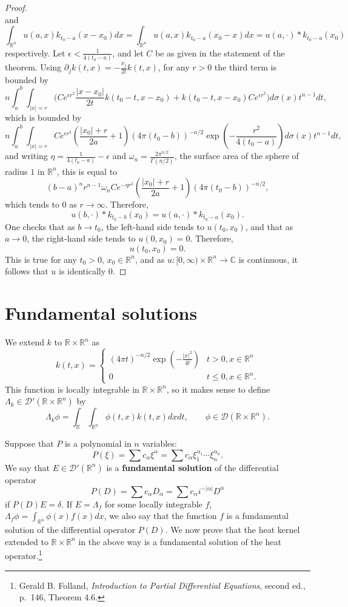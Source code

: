 \documentclass{article}
\begin{document}
\begin{proof}
\[\]
and
\[
\int_{\mathbb{R}^n} u(a,x) k_{t_0-a}(x-x_0) dx = \int_{\mathbb{R}^n} u(a,x) k_{t_0-a}(x_0-x) dx
=u(a,\cdot)*k_{t_0-a}(x_0)
\]
respectively. Let $\epsilon<\frac{1}{4(t_0-a)}$, and let $C$ be as given in the statement of the theorem. 
Using $\partial_j k (t,x) = -\frac{x_j}{2t}k(t,x)$, for any $r>0$ the third term is bounded by
\[
n \int_a^b \int_{|x|=r} \Big( Ce^{\epsilon r^2} \frac{|x-x_0|}{2t} k(t_0-t,x-x_0)+k(t_0-t,x-x_0) Ce^{\epsilon r^2}\Big) d\sigma(x) t^{n-1} dt,
\]
which is bounded by
\[
n\int_a^b \int_{|x|=r} Ce^{\epsilon r^2} \left( \frac{|x_0|+r}{2a}+1 \right) (4\pi(t_0-b))^{-n/2} 
\exp\left(-\frac{r^2}{4(t_0-a)} \right) d\sigma(x) t^{n-1} dt,
\]
and writing $\eta= \frac{1}{4(t_0-a)}-\epsilon$ and 
$\omega_n=\frac{2\pi^{n/2}}{\Gamma(n/2)}$, the surface area of the sphere of radius $1$ in $\mathbb{R}^n$,
this is equal to
\[
(b-a)^n r^{n-1} \omega_n Ce^{-\eta r^2}  \left( \frac{|x_0|+r}{2a}+1 \right) (4\pi(t_0-b))^{-n/2},
\]
which tends to $0$ as $r \to \infty$. 
Therefore,
\[
u(b,\cdot)*k_{t_0-b}(x_0)=u(a,\cdot)*k_{t_0-a}(x_0).
\]
One checks that as $b \to t_0$, the left-hand side tends to $u(t_0,x_0)$, and that as $a \to 0$, the right-hand side tends to $u(0,x_0)=0$. 
Therefore,
\[
u(t_0,x_0)=0.
\]
This is true for any $t_0>0$, $x_0 \in \mathbb{R}^n$, and as $u:[0,\infty) \times \mathbb{R}^n \to \mathbb{C}$ is continuous, it follows
that $u$ is identically $0$.
\end{proof}


\section{Fundamental solutions}
We extend $k$ to $\mathbb{R} \times \mathbb{R}^n$ as
\[
k(t,x)=\begin{cases}
(4\pi t)^{-n/2} \exp\left(-\frac{|x|^2}{4t} \right)&t>0, x \in \mathbb{R}^n\\
0&t\leq 0, x \in \mathbb{R}^n.
\end{cases}
\]
This function is locally integrable in $\mathbb{R} \times \mathbb{R}^n$, so it makes sense to define
 $\Lambda_k \in \mathscr{D}'(\mathbb{R} \times \mathbb{R}^n)$ by
\[
\Lambda_k \phi =\int_\mathbb{R} \int_{\mathbb{R}^n} \phi(t,x) k(t,x) dx dt, \qquad \phi \in \mathscr{D}(\mathbb{R} \times \mathbb{R}^n).
\]

Suppose that $P$ is a polynomial in $n$ variables: 
\[
P(\xi)=\sum c_\alpha \xi^\alpha=\sum c_\alpha \xi_1^{\alpha_1} \cdots \xi_n^{\alpha_n}.
\]
 We say that $E \in \mathscr{D}'(\mathbb{R}^n)$ is a \textbf{fundamental solution} of
the differential operator
\[
P(D) = \sum c_\alpha D_\alpha = \sum c_\alpha i^{-|\alpha|} D^\alpha
\]
if $P(D)E=\delta$. If $E=\Lambda_f$ for some locally integrable $f$, $\Lambda_f \phi = \int_{\mathbb{R}^n} \phi(x) f(x) dx$, we also say that the function
$f$ is a fundamental solution
of the differential operator $P(D)$. We now prove that the heat kernel extended to $\mathbb{R} \times \mathbb{R}^n$ in the above way
is a fundamental solution of the heat operator.\footnote{Gerald B. Folland, {\em Introduction to Partial Differential Equations}, second ed.,
p.~146, Theorem 4.6.}
\end{document}
